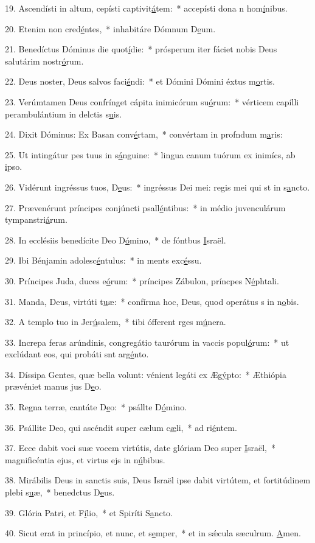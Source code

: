 19. Ascendísti in altum, cepísti captivit\uline{á}tem:~* accepísti dona n hom\uline{í}nibus.\par 
20. Etenim non cred\uline{é}ntes,~* inhabitáre Dómnum D\uline{e}um.\par 
21. Benedíctus Dóminus die quot\uline{í}die:~* prósperum iter fáciet nobis Deus salutárim nostr\uline{ó}rum.\par 
22. Deus noster, Deus salvos faci\uline{é}ndi:~* et Dómini Dómini éxtus m\uline{o}rtis.\par 
23. Verúmtamen Deus confrínget cápita inimicórum su\uline{ó}rum:~* vérticem capílli perambulántium in delctis s\uline{u}is.\par 
24. Dixit Dóminus: Ex Basan conv\uline{é}rtam,~* convértam in profndum m\uline{a}ris:\par 
25. Ut intingátur pes tuus in s\uline{á}nguine:~* lingua canum tuórum ex inimícs, ab \uline{i}pso.\par 
26. Vidérunt ingréssus tuos, D\uline{e}us:~* ingréssus Dei mei: regis mei qui st in s\uline{a}ncto.\par 
27. Prævenérunt príncipes conjúncti psall\uline{é}ntibus:~* in médio juvenculárum tympanstri\uline{á}rum.\par 
28. In ecclésiis benedícite Deo D\uline{ó}mino,~* de fóntbus \uline{I}sraël.\par 
29. Ibi Bénjamin adolesc\uline{é}ntulus:~* in ments exc\uline{é}ssu.\par 
30. Príncipes Juda, duces e\uline{ó}rum:~* príncipes Zábulon, príncpes N\uline{é}phtali.\par 
31. Manda, Deus, virtúti t\uline{u}æ:~* confírma hoc, Deus, quod operátus s in n\uline{o}bis.\par 
32. A templo tuo in Jer\uline{ú}salem,~* tibi ófferent rges m\uline{ú}nera.\par 
33. Increpa feras arúndinis, congregátio taurórum in vaccis popul\uline{ó}rum:~* ut exclúdant eos, qui probáti snt arg\uline{é}nto.\par 
34. Díssipa Gentes, quæ bella volunt: vénient legáti ex Æg\uline{ý}pto:~* Æthiópia prævéniet manus jus D\uline{e}o.\par 
35. Regna terræ, cantáte D\uline{e}o:~* psállte D\uline{ó}mino.\par 
36. Psállite Deo, qui ascéndit super cælum c\uline{æ}li,~* ad ri\uline{é}ntem.\par 
37. Ecce dabit voci suæ vocem virtútis, date glóriam Deo super \uline{I}sraël,~* magnificéntia ejus, et virtus ejs in n\uline{ú}bibus.\par 
38. Mirábilis Deus in sanctis suis, Deus Israël ipse dabit virtútem, et fortitúdinem plebi s\uline{u}æ,~* benedctus D\uline{e}us.\par 
39. Glória Patri, et F\uline{í}lio,~* et Spiríti S\uline{a}ncto.\par 
40. Sicut erat in princípio, et nunc, et s\uline{e}mper,~* et in sǽcula sæculrum. \uline{A}men.\par 

